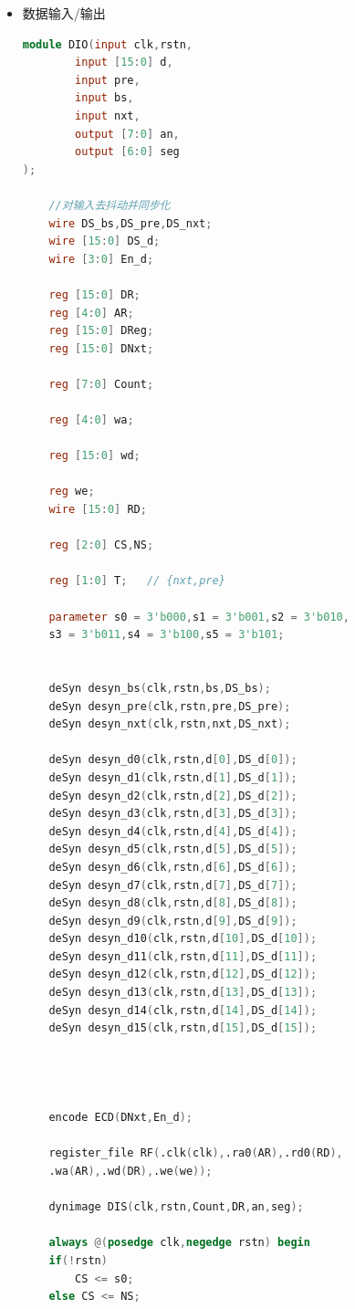 \documentclass[UTF8,fontset=fandol]{ctexart}
\begin{document}
\begin{itemize}
\begin{itemize}
\begin{lstlisting}[language=Verilog,keywordstyle=\color{red!70}]
        always  @ (posedge  clk)
            if (we)  rf[wa]  <=  wd;		//写操作
        endmodule
    \end{lstlisting}
    \item 数据输入/输出
    \begin{lstlisting}[language=Verilog,keywordstyle=\color{red!70}]
module DIO(input clk,rstn,
        input [15:0] d,
        input pre,
        input bs,
        input nxt,
        output [7:0] an,
        output [6:0] seg
);

    //对输入去抖动并同步化
    wire DS_bs,DS_pre,DS_nxt;
    wire [15:0] DS_d;
    wire [3:0] En_d;

    reg [15:0] DR;
    reg [4:0] AR;
    reg [15:0] DReg;
    reg [15:0] DNxt;

    reg [7:0] Count;

    reg [4:0] wa;

    reg [15:0] wd;

    reg we;
    wire [15:0] RD;

    reg [2:0] CS,NS;

    reg [1:0] T;   // {nxt,pre}

    parameter s0 = 3'b000,s1 = 3'b001,s2 = 3'b010,
    s3 = 3'b011,s4 = 3'b100,s5 = 3'b101;


    deSyn desyn_bs(clk,rstn,bs,DS_bs);
    deSyn desyn_pre(clk,rstn,pre,DS_pre);
    deSyn desyn_nxt(clk,rstn,nxt,DS_nxt);

    deSyn desyn_d0(clk,rstn,d[0],DS_d[0]);
    deSyn desyn_d1(clk,rstn,d[1],DS_d[1]);
    deSyn desyn_d2(clk,rstn,d[2],DS_d[2]);
    deSyn desyn_d3(clk,rstn,d[3],DS_d[3]);
    deSyn desyn_d4(clk,rstn,d[4],DS_d[4]);
    deSyn desyn_d5(clk,rstn,d[5],DS_d[5]);
    deSyn desyn_d6(clk,rstn,d[6],DS_d[6]);
    deSyn desyn_d7(clk,rstn,d[7],DS_d[7]);
    deSyn desyn_d8(clk,rstn,d[8],DS_d[8]);
    deSyn desyn_d9(clk,rstn,d[9],DS_d[9]);
    deSyn desyn_d10(clk,rstn,d[10],DS_d[10]);
    deSyn desyn_d11(clk,rstn,d[11],DS_d[11]);
    deSyn desyn_d12(clk,rstn,d[12],DS_d[12]);
    deSyn desyn_d13(clk,rstn,d[13],DS_d[13]);
    deSyn desyn_d14(clk,rstn,d[14],DS_d[14]);
    deSyn desyn_d15(clk,rstn,d[15],DS_d[15]);




    encode ECD(DNxt,En_d);

    register_file RF(.clk(clk),.ra0(AR),.rd0(RD),
    .wa(AR),.wd(DR),.we(we));

    dynimage DIS(clk,rstn,Count,DR,an,seg);

    always @(posedge clk,negedge rstn) begin
    if(!rstn) 
        CS <= s0;
    else CS <= NS;


\end{lstlisting}
\end{itemize}
\end{itemize}
\end{document}
